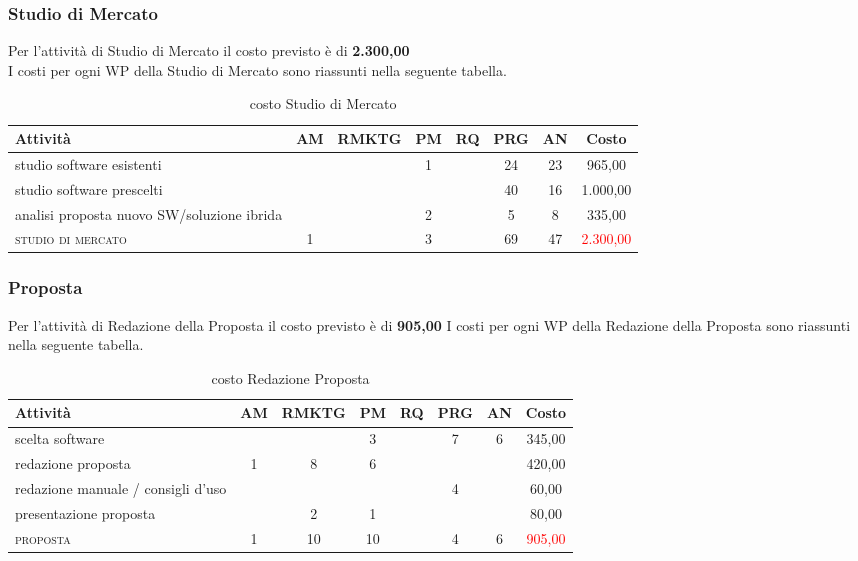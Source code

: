 \subsubsection{Studio di Mercato}

Per l'attività di Studio di Mercato il costo previsto è di \textbf{ \text{\euro}2.300,00 }\\	
I costi per ogni WP della Studio di Mercato sono riassunti nella seguente tabella.

\begin{table}[!h]
\footnotesize
\centering
\begin{tabular}{|p{}|c|c|c|c|c|c|c|}
\hline
\textbf{Attività}& \textbf{AM} & \textbf{RMKTG} & \textbf{PM} & \textbf{RQ} & \textbf{PRG} & \textbf{AN} & \textbf{Costo}  \\ 
            
\hline
studio software esistenti & & & 1& & 24& 23& \text{\euro} 965,00\\
studio software prescelti	 				  & & &	&	&40 &16 & \text{\euro} 1.000,00 \\	
analisi proposta nuovo SW/soluzione ibrida 					  & & &2 & 	&5	&  8  &  	\text{\euro} 335,00 \\			  
\hline
\scshape{}studio di mercato  							& 1 &  &3 & &69	&47	&	\textcolor{red}{ \text{\euro}2.300,00 }\\		 
\hline
\end{tabular}
\caption{costo Studio di Mercato}\label{tab:mercato}
\end{table}

\subsubsection{Proposta}
Per l'attività di Redazione della Proposta il costo previsto è di \textbf	{ \text{\euro} 905,00 }	
I costi per ogni WP della Redazione della Proposta sono riassunti nella seguente tabella.

\begin{table}[!h]
\footnotesize
\centering
\begin{tabular}{|p{}|c|c|c|c|c|c|c|}
\hline
\textbf{Attività}& \textbf{AM} & \textbf{RMKTG} & \textbf{PM} & \textbf{RQ} & \textbf{PRG} & \textbf{AN} & \textbf{Costo}  \\ 
\hline
scelta software			& & & 3&	& 7&	6& 	\text{\euro} 345,00 \\
redazione proposta & 1&	8&	6& & & & 	 \text{\euro} 420,00 \\
redazione manuale / consigli d'uso & & & & & 					4 && 	\text{\euro} 60,00 \\	
presentazione proposta		 & & 2&  	1	& & 	& & 		 \text{\euro} 80,00 \\	
\hline
\scshape{}proposta  							& 1  &10 &10& &	4&	6&	\textcolor{red}{ \text{\euro} 905,00 }\\		 
\hline
\end{tabular}
\caption{costo Redazione Proposta}\label{tab:proposta}
\end{table}	
	
